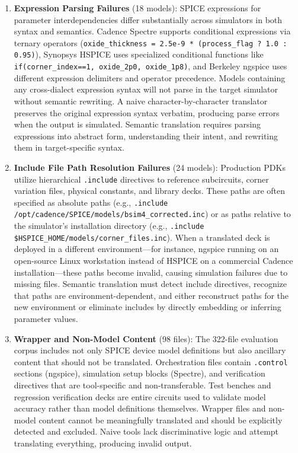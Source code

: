 \documentclass[conference]{IEEEtran}
\begin{document}
\begin{enumerate}
\item \textbf{Expression Parsing Failures} (18 models): SPICE expressions for parameter interdependencies differ substantially across simulators in both syntax and semantics. Cadence Spectre supports conditional expressions via ternary operators (\texttt{oxide\_thickness = 2.5e-9 * (process\_flag ? 1.0 : 0.95)}), Synopsys HSPICE uses specialized conditional functions like \texttt{if(corner\_index==1, oxide\_2p0, oxide\_1p8)}, and Berkeley ngspice uses different expression delimiters and operator precedence. Models containing any cross-dialect expression syntax will not parse in the target simulator without semantic rewriting. A naive character-by-character translator preserves the original expression syntax verbatim, producing parse errors when the output is simulated. Semantic translation requires parsing expressions into abstract form, understanding their intent, and rewriting them in target-specific syntax.

\item \textbf{Include File Path Resolution Failures} (24 models): Production PDKs utilize hierarchical \texttt{.include} directives to reference subcircuits, corner variation files, physical constants, and library decks. These paths are often specified as absolute paths (e.g., \texttt{.include /opt/cadence/SPICE/models/bsim4\_corrected.inc}) or as paths relative to the simulator's installation directory (e.g., \texttt{.include \$HSPICE\_HOME/models/corner\_files.inc}). When a translated deck is deployed in a different environment---for instance, ngspice running on an open-source Linux workstation instead of HSPICE on a commercial Cadence installation---these paths become invalid, causing simulation failures due to missing files. Semantic translation must detect include directives, recognize that paths are environment-dependent, and either reconstruct paths for the new environment or eliminate includes by directly embedding or inferring parameter values.

\item \textbf{Wrapper and Non-Model Content} (98 files): The 322-file evaluation corpus includes not only SPICE device model definitions but also ancillary content that should not be translated. Orchestration files contain \texttt{.control} sections (ngspice), simulation setup blocks (Spectre), and verification directives that are tool-specific and non-transferable. Test benches and regression verification decks are entire circuits used to validate model accuracy rather than model definitions themselves. Wrapper files and non-model content cannot be meaningfully translated and should be explicitly detected and excluded. Naive tools lack discriminative logic and attempt translating everything, producing invalid output.


\end{enumerate}
\end{document}
